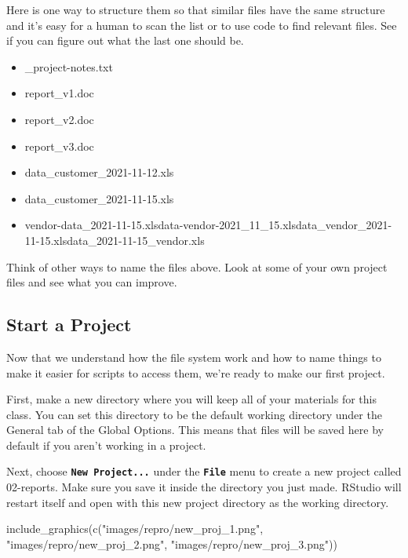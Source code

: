 \documentclass[
  oneside]{book}
\newenvironment{Shaded}{\begin{snugshade}}{\end{snugshade}}
\newcommand{\FunctionTok}[1]{\textcolor[rgb]{0.00,0.00,0.00}{#1}}
\newcommand{\NormalTok}[1]{#1}
\newcommand{\StringTok}[1]{\textcolor[rgb]{0.31,0.60,0.02}{#1}}
\providecommand{\tightlist}{%
  \setlength{\itemsep}{0pt}\setlength{\parskip}{0pt}}
\begin{document}
Here is one way to structure them so that similar files have the same structure and it's easy for a human to scan the list or to use code to find relevant files. See if you can figure out what the last one should be.

\begin{itemize}
\tightlist
\item
  \_project-notes.txt
\item
  report\_v1.doc
\item
  report\_v2.doc
\item
  report\_v3.doc
\item
  data\_customer\_2021-11-12.xls
\item
  data\_customer\_2021-11-15.xls
\item
  vendor-data\_2021-11-15.xlsdata-vendor-2021\_11\_15.xlsdata\_vendor\_2021-11-15.xlsdata\_2021-11-15\_vendor.xls
\end{itemize}

\begin{try}
Think of other ways to name the files above. Look at some of your own project files and see what you can improve.

\end{try}

\hypertarget{start-a-project}{%
\subsection{Start a Project}\label{start-a-project}}

Now that we understand how the file system work and how to name things to make it easier for scripts to access them, we're ready to make our first project.

First, make a new directory where you will keep all of your materials for this class. You can set this directory to be the default working directory under the General tab of the Global Options. This means that files will be saved here by default if you aren't working in a project.

Next, choose \textbf{\texttt{New\ Project...}} under the \textbf{\texttt{File}} menu to create a new project called 02-reports. Make sure you save it inside the directory you just made. RStudio will restart itself and open with this new project directory as the working directory.

\begin{Shaded}
\begin{Highlighting}[]
\FunctionTok{include\_graphics}\NormalTok{(}\FunctionTok{c}\NormalTok{(}\StringTok{"images/repro/new\_proj\_1.png"}\NormalTok{,}
                   \StringTok{"images/repro/new\_proj\_2.png"}\NormalTok{,}
                   \StringTok{"images/repro/new\_proj\_3.png"}\NormalTok{))}
\end{Highlighting}
\end{Shaded}
\end{document}
